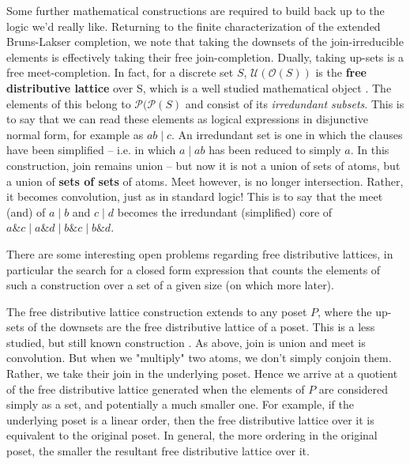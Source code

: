 \documentclass[hoptionsi,review,format=acmsmall]{acmart}
\theoremstyle{definition}
\newcommand{\Oc}{\mathcal{O}}
\newcommand{\Pc}{\mathcal{P}}
\newcommand{\Ucc}{\mathcal{U}}
\newcommand{\band}{\mathbin{\&}}
\newcommand{\bor}{\mathbin{|}}
\begin{document}
Some further mathematical constructions are required to build back up to the logic we'd really like. Returning to the finite characterization of the extended Bruns-Lakser completion, we note that taking the downsets of the join-irreducible elements is effectively taking their free join-completion. Dually, taking up-sets is a free meet-completion. In fact, for a discrete set \(S\), \(\Ucc(\Oc(S))\) is the \textbf{free distributive lattice} over S, which is a well studied mathematical object \cite{gratzer2009lattice}. The elements of this belong to \(\Pc(\Pc(S)\) and consist of its \textit{irredundant subsets}. This is to say that we can read these elements as logical expressions in disjunctive normal form, for example as \(ab \bor c\). An irredundant set is one in which the clauses have been simplified -- i.e. in which \(a \bor ab\) has been reduced to simply \(a\).  In this construction, join remains union -- but now it is not a union of sets of atoms, but a union of \textbf{sets of sets} of atoms. Meet however, is no longer intersection. Rather, it becomes convolution, just as in standard logic! This is to say that the meet (and) of \(a \bor b\) and \(c \bor d\) becomes the irredundant (simplified) core of \(a \band c \bor a \band d \bor b \band c \bor b \band d\).

There are some interesting open problems regarding free distributive lattices, in particular the search for a closed form expression that counts the elements of such a construction over a set of a given size (on which more later).

The free distributive lattice construction extends to any poset \(P\), where the up-sets of the downsets are the free distributive lattice of a poset. This is a less studied, but still known construction \cite{johnstone1982stone}. As above, join is union and meet is convolution. But when we "multiply" two atoms, we don't simply conjoin them. Rather, we take their join in the underlying poset. Hence we arrive at a quotient of the free distributive lattice generated when the elements of \(P\) are considered simply as a set, and potentially a much smaller one. For example, if the underlying poset is a linear order, then the free distributive lattice over it is equivalent to the original poset. In general, the more ordering in the original poset, the smaller the resultant free distributive lattice over it.
\end{document}
